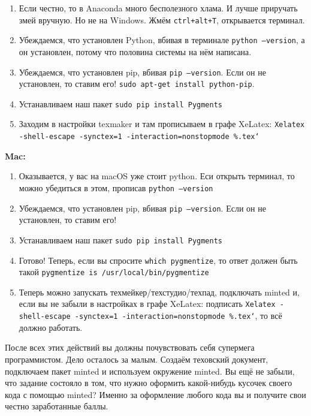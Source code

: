 \documentclass[12pt, a4paper, oneside]{article}
\begin{document}
\begin{enumerate}
	\item Если честно, то в Anaconda много бесполезного хлама. И лучше приручать змей вручную. Но не на Windows. Жмём \texttt{ctrl+alt+T}, открывается терминал. 
	\item Убеждаемся, что установлен Python, вбивая в терминале \texttt{python --version}, а он установлен, потому что половина системы на нём написана.
	\item Убеждаемся, что установлен pip, вбивая  \texttt{pip --version}. Если он не установлен, то ставим его!  \texttt{sudo apt-get install python-pip}.
	\item Устанавливаем наш пакет  \texttt{sudo pip install Pygments}
	\item Заходим в настройки texmaker и там прописываем в графе  XeLatex:  \newline \texttt{Xelatex -shell-escape -synctex=1 -interaction=nonstopmode \%.tex`}
\end{enumerate} 

\textbf{Mac:}

\begin{enumerate}
	\item Оказывается, у вас на macOS уже стоит python. Еси открыть терминал, то можно убедиться в этом, прописав \texttt{python --version}
	\item Убеждаемся, что установлен pip, вбивая  \texttt{pip --version}. Если он не установлен, то ставим его!  
	\item Устанавливаем наш пакет  \texttt{sudo pip install Pygments}
	\item  Готово! Теперь, если вы спросите \texttt{which pygmentize}, то  ответ должен быть такой  \texttt{pygmentize is /usr/local/bin/pygmentize}
	\item Теперь можно запускать техмейкер/техстудио/техпад, подключать minted и, если вы не забыли в настройках  в графе  XeLatex:  подписать  \texttt{Xelatex -shell-escape -synctex=1 -interaction=nonstopmode \%.tex`}, то всё должно работать.
\end{enumerate} 


После всех этих действий вы должны почувствовать себя супермега программистом. Дело осталось за малым. Создаём теховский документ, подключаем пакет minted и используем окружение minted. Вы ещё не забыли, что задание состояло в том, что нужно оформить какой-нибудь кусочек своего кода с помощью minted? Именно за оформление любого кода вы и получите свои честно заработанные баллы. 
\end{document}
